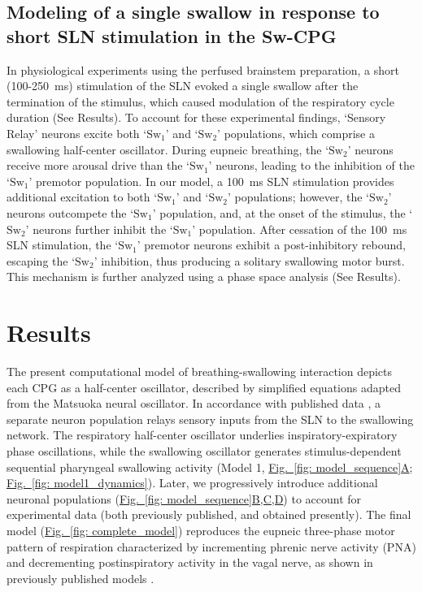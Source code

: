 \documentclass[pdflatex,sn-mathphys-ay]{sn-jnl}%
\renewcommand{\figureautorefname}{Fig.}
\newcommand{\Figref}[2][]{\hyperref[#2]{\figureautorefname~\ref*{#2}#1}}
\theoremstyle{thmstyleone}%
\theoremstyle{thmstyletwo}%
\theoremstyle{thmstylethree}%
\begin{document}
\subsection{Modeling of a single swallow in response to short SLN stimulation in the Sw-CPG}
In physiological experiments using the perfused brainstem preparation, a short (100-250~ms) stimulation of the SLN evoked a single swallow after the termination of the stimulus, which caused modulation of the respiratory cycle duration (See Results). To account for these experimental findings, `Sensory Relay' neurons excite both `$\text{Sw}_1$' and `$\text{Sw}_2$' populations, which comprise a swallowing half-center oscillator. During eupneic breathing, the `$\text{Sw}_2$' neurons receive more arousal drive than the `$\text{Sw}_1$' neurons, leading to the inhibition of the `$\text{Sw}_1$' premotor population. In our model, a 100~ms SLN stimulation provides additional excitation to both `$\text{Sw}_1$' and `$\text{Sw}_2$' populations; however, the `$\text{Sw}_2$' neurons outcompete the `$\text{Sw}_1$' population, and, at the onset of the stimulus, the `$\text{Sw}_2$' neurons further inhibit the ‘$\text{Sw}_1$’ population. After cessation of the 100~ms SLN stimulation, the `$\text{Sw}_1$' premotor neurons exhibit a post-inhibitory rebound, escaping the `$\text{Sw}_2$' inhibition, thus producing a solitary swallowing motor burst. This mechanism is further analyzed using a phase space analysis (See Results).

\section{Results}\label{sec: results}
The present computational model of breathing-swallowing interaction depicts each CPG as a half-center oscillator, described by simplified equations adapted from the Matsuoka neural oscillator. In accordance with published data \citep{fuse2025spatio}, a separate neuron population relays sensory inputs from the SLN to the swallowing network. The respiratory half-center oscillator underlies inspiratory-expiratory phase oscillations, while the swallowing oscillator generates stimulus-dependent sequential pharyngeal swallowing activity (Model 1, \Figref[A]{fig: model_sequence}; \Figref[]{fig: model1_dynamics}). Later, we progressively introduce additional neuronal populations (\Figref[B,C,D]{fig: model_sequence}) to account for experimental data (both previously published, and obtained presently). The final model (\Figref[]{fig: complete_model}) reproduces the eupneic three-phase motor pattern of respiration characterized by incrementing phrenic nerve activity (PNA) and decrementing postinspiratory activity in the vagal nerve, as shown in previously published models \citep{rybak2004modeling, smith2007spatial}.
\end{document}
